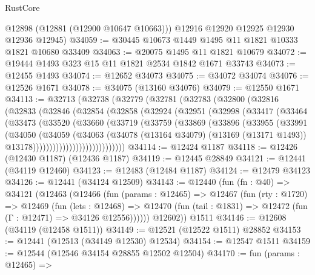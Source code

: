 \begin{lexlean}{RustCore}
\begin{coremodule}
        @12898
        (@12881 (@12900 @10647 @10663)))
      @12916
      @12920
      @12925
      @12930
      @12936
      @12945)
@34059 := @30445 @10673 @1449 @1495 @11 @1821 @10333 @1821 @10680 @33409
@34063 := @20075 @1495 @11 @1821 @10679
@34072 := @19444 @1493 @323 @15 @11 @1821 @2534 @1842 @1671 @33743
@34073 := @12455 @1493
@34074 := @12652 @34073
@34075 := @34072 @34074
@34076 := @12526 @1671
@34078 := @34075 (@13160 @34076)
@34079 := @12550 @1671
@34113 := @32713
    (@32738
      (@32779
        (@32781
          (@32783
            (@32800
              (@32816
                (@32833
                  (@32846
                    (@32854
                      (@32858
                        (@32924
                          (@32951
                            (@32998
                              (@33417
                                (@33464
                                  (@33473
                                    (@33520
                                      (@33660
                                        (@33719
                                          (@33759
                                            (@33869
                                              (@33896
                                                (@33955
                                                  (@33991
                                                    (@34050
                                                      (@34059
                                                        (@34063
                                                          (@34078
                                                            (@13164 @34079)
                                                            (@13169 (@13171 @1493))
                                                            @13178))))))))))))))))))))))))))))
@34114 := @12424 @1187
@34118 := @12426 (@12430 @1187) (@12436 @1187)
@34119 := @12445 @28849
@34121 := @12441 (@34119 @12460)
@34123 := @12483 (@12484 @1187)
@34124 := @12479 @34123
@34126 := @12441 (@34124 @12509)
@34143 := @12440
    (fun (fn : @40) =>
    @34121
      (@12463
        (@12466
          (fun (params : @12465) =>
          @12467
            (fun (rty : @1720) =>
            @12469
              (fun (lets : @12468) =>
              @12470 (fun (tail : @1831) => @12472 (fun (Γ : @12471) => @34126 @12556))))))
        @12602))
    @1511
@34146 := @12608 (@34119 (@12458 @1511))
@34149 := @12521 (@12522 @1511) @28852
@34153 := @12441 (@12513 (@34149 @12530) @12534)
@34154 := @12547 @1511
@34159 := @12544 (@12546 @34154 @28855 @12502 @12504)
@34170 := fun (params : @12465) =>

\end{coremodule}
\end{lexlean}
